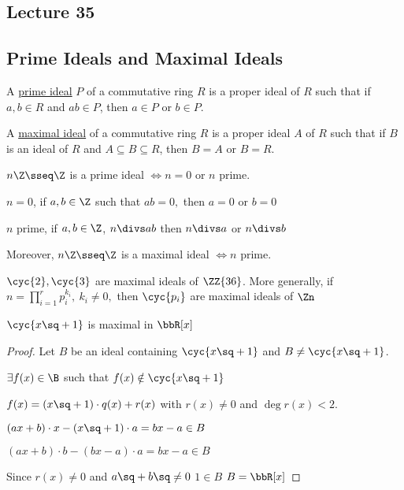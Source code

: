\subsection*{Lecture 35} %
\subsection{Prime Ideals and Maximal Ideals}
\begin{definition}
  A \ul{prime ideal} \( P \) of a commutative ring \( R \) is a proper ideal of \( R \) such that if \( a,b\in R \) and \( ab\in P \), then \( a\in P \) or \( b\in P \).

  A \ul{maximal ideal} of a commutative ring \( R \) is a proper ideal \( A \) of \( R \) such that if \( B \) is an ideal of \( R \) and \( A\subseteq B\subseteq R \), then \( B=A \) or \( B=R \).
\end{definition}

\begin{example}
  \( n\Z \sseq \Z \) is a prime ideal \( \iff n=0 \) or \( n \) prime.

  \begin{note}
    \( n = 0 \), if \( a,b\in \Z \) such that \( ab = 0, \) then \( a=0 \) or \( b=0 \) \checkmark

    \( n \) prime, if \( a,b\in\Z \), \( n\divs ab \) then \( n\divs a  \) or \( n\divs b \) \checkmark
  \end{note}
  Moreover, \( n\Z\sseq\Z \) is a maximal ideal \( \iff n \) prime.
\end{example}

\begin{example}
  \( \cyc{2}, \cyc{3} \) are maximal ideals of \( \ZZ{36} \). More generally, if \( n=\prod_{i=1}^{r} p_{i}^{k_{i}},\ k_i\neq 0,\) then \( \cyc{p_i} \) are maximal ideals of \( \Zn \)
\end{example}

\begin{example}
  \( \cyc{x\sq +1} \) is maximal in \( \bbR[x] \)
\end{example}

\begin{proof}
  Let \( B \) be an ideal containing \( \cyc{x\sq + 1} \) and \( B\neq \cyc{x\sq + 1} \).

  \imp \( \exists f(x) \in\B \) such that \( f(x) \notin \cyc{x\sq + 1} \)

  \imp \( f(x) = (x\sq+1) \cdot q(x) + r(x) \) with \( r(x)\neq 0 \) and \( \deg r(x) <2 \).

  \imp \( (ax+b) \cdot x - (x\sq+1)\cdot a = bx-a \in B \)

  \imp \( (ax+b) \cdot b - (bx-a)\cdot a = bx-a \in B \)

  Since \( r(x) \neq 0 \) and \( a\sq+b\sq \neq 0 \) \imp \( 1\in B \) \imp \( B = \bbR[x] \)
\end{proof}

